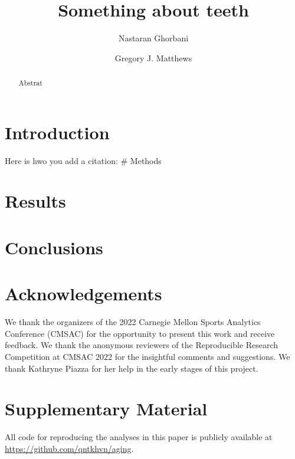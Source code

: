 \documentclass{statsoc}
\title[Filling in the Gaps]{Something about teeth}
\author[Quang Nguyen and Gregory J. Matthews]{Nastaran Ghorbani}
\author[Quang Nguyen and Gregory J. Matthews]{Gregory J. Matthews}
\begin{document}
\begin{abstract}
Abstrat
\end{abstract}

\newpage

\hypertarget{sec:intro}{%
\section{Introduction}\label{sec:intro}}

Here is hwo you add a citation: \citet{R2022language} \# Methods

\hypertarget{results}{%
\section{Results}\label{results}}

\hypertarget{conclusions}{%
\section{Conclusions}\label{conclusions}}

\hypertarget{acknowledgements}{%
\section*{Acknowledgements}\label{acknowledgements}}

We thank the organizers of the 2022 Carnegie Mellon Sports Analytics
Conference (CMSAC) for the opportunity to present this work and receive
feedback. We thank the anonymous reviewers of the Reproducible Research
Competition at CMSAC 2022 for the insightful comments and suggestions.
We thank Kathryne Piazza for her help in the early stages of this
project.

\hypertarget{supplementary-material}{%
\section*{Supplementary Material}\label{supplementary-material}}

All code for reproducing the analyses in this paper is publicly
available at \url{https://github.com/qntkhvn/aging}.



\end{document}
